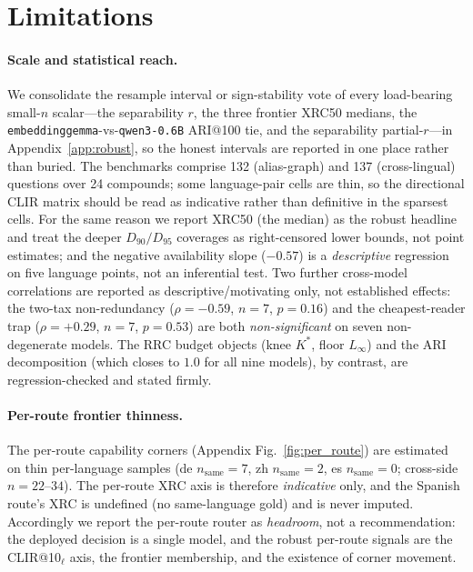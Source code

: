 \documentclass[11pt]{article}
\begin{document}
\section*{Limitations}

\paragraph{Scale and statistical reach.}
We consolidate the resample interval or sign-stability vote of every
load-bearing small-$n$ scalar---the separability $r$, the three frontier XRC50
medians, the \texttt{embeddinggemma}-vs-\texttt{qwen3-0.6B} ARI@100 tie, and the
separability partial-$r$---in Appendix~\ref{app:robust}, so the honest intervals
are reported in one place rather than buried.
The benchmarks comprise 132 (alias-graph) and 137 (cross-lingual) questions over
24 compounds; some language-pair cells are thin, so the directional CLIR matrix
should be read as indicative rather than definitive in the sparsest cells. For
the same reason we report XRC50 (the median) as the robust headline and treat
the deeper $D_{90}/D_{95}$ coverages as right-censored lower bounds, not point
estimates; and the negative availability slope ($-0.57$) is a \emph{descriptive}
regression on five language points, not an inferential test. Two further
cross-model correlations are reported as descriptive/motivating only, not
established effects: the two-tax non-redundancy
($\rho{=}{-}0.59$, $n{=}7$, $p{=}0.16$) and the cheapest-reader trap
($\rho{=}{+}0.29$, $n{=}7$, $p{=}0.53$) are both \emph{non-significant} on seven
non-degenerate models. The RRC budget objects (knee $K^{\!*}$, floor $L_\infty$)
and the ARI decomposition (which closes to $1.0$ for all nine models), by
contrast, are regression-checked and stated firmly.

\paragraph{Per-route frontier thinness.}
The per-route capability corners (Appendix Fig.~\ref{fig:per_route}) are estimated on
thin per-language samples (de $n_{\text{same}}{=}7$, zh $n_{\text{same}}{=}2$, es
$n_{\text{same}}{=}0$; cross-side $n{=}22$--$34$). The per-route XRC axis is
therefore \emph{indicative} only, and the Spanish route's XRC is undefined (no
same-language gold) and is never imputed. Accordingly we report the per-route
router as \emph{headroom}, not a recommendation: the deployed decision is a single
model, and the robust per-route signals are the CLIR@10$_\ell$ axis, the frontier
membership, and the existence of corner movement.
\end{document}
